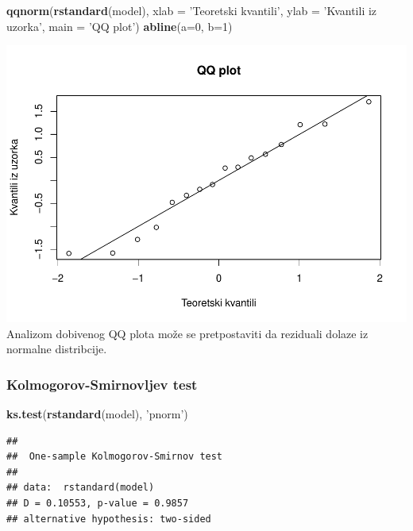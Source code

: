 \documentclass[]{article}
\newenvironment{Shaded}{\begin{snugshade}}{\end{snugshade}}
\newcommand{\KeywordTok}[1]{\textcolor[rgb]{0.13,0.29,0.53}{\textbf{{#1}}}}
\newcommand{\DataTypeTok}[1]{\textcolor[rgb]{0.13,0.29,0.53}{{#1}}}
\newcommand{\DecValTok}[1]{\textcolor[rgb]{0.00,0.00,0.81}{{#1}}}
\newcommand{\StringTok}[1]{\textcolor[rgb]{0.31,0.60,0.02}{{#1}}}
\newcommand{\NormalTok}[1]{{#1}}
\begin{document}
\begin{Shaded}
\begin{Highlighting}[]
\KeywordTok{qqnorm}\NormalTok{(}\KeywordTok{rstandard}\NormalTok{(model), }\DataTypeTok{xlab =} \StringTok{'Teoretski kvantili'}\NormalTok{, }\DataTypeTok{ylab =} \StringTok{'Kvantili iz uzorka'}\NormalTok{,}
       \DataTypeTok{main =} \StringTok{'QQ plot'}\NormalTok{)}
\KeywordTok{abline}\NormalTok{(}\DataTypeTok{a=}\DecValTok{0}\NormalTok{, }\DataTypeTok{b=}\DecValTok{1}\NormalTok{)}
\end{Highlighting}
\end{Shaded}

\includegraphics{Izvjestaj_files/figure-latex/unnamed-chunk-21-1.pdf}
Analizom dobivenog QQ plota može se pretpostaviti da reziduali dolaze iz
normalne distribcije.

\subsubsection{Kolmogorov-Smirnovljev
test}\label{kolmogorov-smirnovljev-test-2}

\begin{Shaded}
\begin{Highlighting}[]
\KeywordTok{ks.test}\NormalTok{(}\KeywordTok{rstandard}\NormalTok{(model), }\StringTok{'pnorm'}\NormalTok{)}
\end{Highlighting}
\end{Shaded}

\begin{verbatim}
## 
##  One-sample Kolmogorov-Smirnov test
## 
## data:  rstandard(model)
## D = 0.10553, p-value = 0.9857
## alternative hypothesis: two-sided
\end{verbatim}
\end{document}
